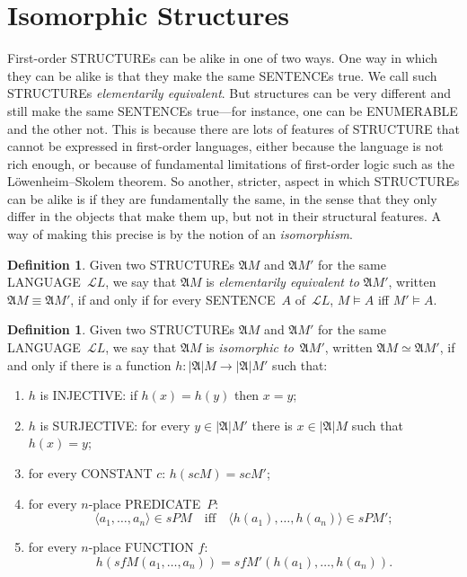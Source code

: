 \documentclass[10pt,a4paper]{article}
\newcommand*{\olup}[1]{\MakeUppercase{#1}}
\theoremstyle{plain}
\theoremstyle{definition}
\newtheorem{defn}[thm]{Definition}
\theoremstyle{remark}
\newcommand*{\olfileid}[3]{}
\newcommand*{\olsection}[1]{\section*{#1}}
\newcommand*{\ollabel}[1]{\label{#1}}
\providecommand{\Struct}{\ensuremath{\mathfrak{A}}}
\providecommand{\Domain}{\ensuremath{|\mathfrak{A}|}}
\providecommand{\Assign}{\ensuremath{s}}
\providecommand{\Sat}[2]{\ensuremath{#1 \models #2}}
\providecommand{\Lang}{\ensuremath{\mathcal{L}}}
\providecommand{\tuple}[1]{\langle #1 \rangle}
\begin{document}



\olfileid{mod}{bas}{iso}
\olsection{Isomorphic Structures}

First-order \olup{structure}s can be alike in one of two ways. One way in
which they can be alike is that they make the same \olup{sentence}s
true. We call such \olup{structure}s \emph{elementarily equivalent}. But
structures can be very different and still make the same \olup{sentence}s
true---for instance, one can be \olup{enumerable} and the other not.
This is because there are lots of features of \olup{structure} that
cannot be expressed in first-order languages, either because the
language is not rich enough, or because of fundamental limitations of
first-order logic such as the L\"owenheim--Skolem theorem. So another,
stricter, aspect in which \olup{structure}s can be alike is if they are
fundamentally the same, in the sense that they only differ in the
objects that make them up, but not in their structural features. A way
of making this precise is by the notion of an \emph{isomorphism}.

\begin{defn}
\ollabel{defn:elem-equiv} 
Given two \olup{structure}s $\Struct{M}$ and $\Struct M'$ for the same
\olup{language}~$\Lang{L}$, we say that $\Struct{M}$ is \emph{elementarily
  equivalent to} $\Struct M'$, written $\Struct{M} \equiv \Struct M'$,
if and only if for every \olup{sentence}~$A$ of~$\Lang{L}$,
$\Sat{M}{A}$ iff $\Sat{M'}{A}$.
\end{defn}

\begin{defn}
\ollabel{defn:isomorphism} Given two \olup{structure}s $\Struct{M}$ and
$\Struct M'$ for the same \olup{language}~$\Lang L$, we say that
$\Struct{M}$ is \emph{isomorphic to}~$\Struct M'$, written $\Struct{M}
\simeq \Struct M'$, if and only if there is a function $h \colon
\Domain{M} \to \Domain{M'}$ such that:
\begin{enumerate}
\item $h$ is \olup{injective}: if $h(x) =
  h(y)$ then $x = y$; 
\item $h$ is \olup{surjective}: for every $y \in \Domain{M'}$ there
  is $x \in \Domain{M}$ such that $h(x) = y$;
\item \ollabel{defn:iso-const}for every \olup{constant} $c$:
  $h(\Assign{c}{M}) = \Assign{c}{M'}$;
\item \ollabel{defn:iso-pred}for every $n$-place \olup{predicate}~$P$:
  \[
  \tuple{a_1, \dots, a_n}\in \Assign{P}{M} \quad\text{iff}\quad
  \tuple{h(a_1), \dots, h(a_n)} \in \Assign{P}{M'};
  \]
\item \ollabel{defn:iso-func}for every $n$-place \olup{function} $f$:
  \[
  h(\Assign{f}{M}(a_1, \dots, a_n)) =
  \Assign{f}{M'}(h(a_1), \dots, h(a_n)).
  \]
\end{enumerate}
\end{defn}
\end{document}
